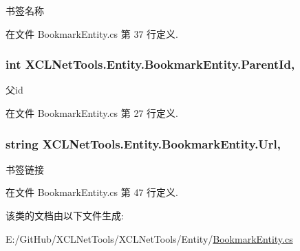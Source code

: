 书签名称 



在文件 Bookmark\+Entity.\+cs 第 37 行定义.

\subsubsection[{\texorpdfstring{Parent\+Id}{ParentId}}]{\setlength{\rightskip}{0pt plus 5cm}int X\+C\+L\+Net\+Tools.\+Entity.\+Bookmark\+Entity.\+Parent\+Id\hspace{0.3cm}{\ttfamily [get]}, {\ttfamily [set]}}\hypertarget{class_x_c_l_net_tools_1_1_entity_1_1_bookmark_entity_afd3c2002aa8d5edeac06f6ef32ba7454}{}\label{class_x_c_l_net_tools_1_1_entity_1_1_bookmark_entity_afd3c2002aa8d5edeac06f6ef32ba7454}


父id 



在文件 Bookmark\+Entity.\+cs 第 27 行定义.

\subsubsection[{\texorpdfstring{Url}{Url}}]{\setlength{\rightskip}{0pt plus 5cm}string X\+C\+L\+Net\+Tools.\+Entity.\+Bookmark\+Entity.\+Url\hspace{0.3cm}{\ttfamily [get]}, {\ttfamily [set]}}\hypertarget{class_x_c_l_net_tools_1_1_entity_1_1_bookmark_entity_a88ebfe2441fd5804a82f5eaee1ce3232}{}\label{class_x_c_l_net_tools_1_1_entity_1_1_bookmark_entity_a88ebfe2441fd5804a82f5eaee1ce3232}


书签链接 



在文件 Bookmark\+Entity.\+cs 第 47 行定义.



该类的文档由以下文件生成\+:\begin{DoxyCompactItemize}
\item 
E\+:/\+Git\+Hub/\+X\+C\+L\+Net\+Tools/\+X\+C\+L\+Net\+Tools/\+Entity/\hyperlink{_bookmark_entity_8cs}{Bookmark\+Entity.\+cs}\end{DoxyCompactItemize}
